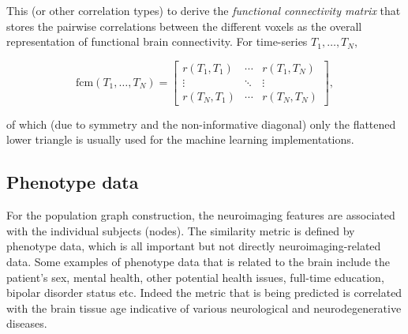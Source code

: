 
This (or other correlation types) to derive the \textit{functional connectivity matrix} that stores the pairwise correlations between the different voxels as the overall representation of functional brain connectivity. For time-series $T_1, \dots, T_N$,

\begin{equation}
    \mathrm{fcm}(T_1, \dots, T_N) = \begin{bmatrix}
        r(T_1, T_1) & \cdots & r(T_1, T_N) \\
        \vdots & \ddots & \vdots \\
        r(T_N, T_1) & \cdots & r(T_N, T_N)
    \end{bmatrix},
\end{equation}

of which (due to symmetry and the non-informative diagonal) only the flattened lower triangle is usually used for the machine learning implementations.

\subsection{Phenotype data}
For the population graph construction, the neuroimaging features are associated with the individual subjects (nodes). The similarity metric is defined by phenotype data, which is all important but not directly neuroimaging-related data. Some examples of phenotype data that is related to the brain include the patient's sex, mental health, other potential health issues, full-time education, bipolar disorder status etc. Indeed the metric that is being predicted is correlated with the brain tissue age indicative of various neurological and neurodegenerative diseases.

